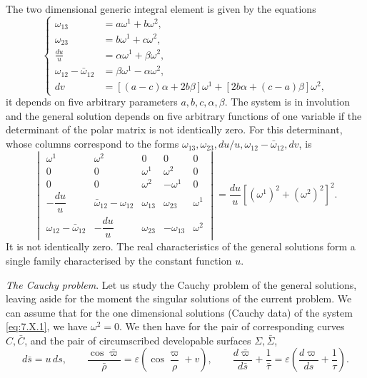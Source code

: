 \documentclass[leqno,11pt]{book}
\numberwithin{equation}{chapter}
\theoremstyle{shape1}
\theoremstyle{shape0}
\theoremstyle{shape2}
\theoremstyle{definition}
\begin{document}
The two dimensional generic integral element is given by the equations
\begin{equation}
  \label{eq:7.X.3}\tag{X, 3}
  \left\{
    \begin{aligned}
      \omega_{13}&=a\omega^{1}+b\omega^{2},\\
      \omega_{23}&=b\omega^{1}+c\omega^{2},\\
      \frac{du}{u}&=\alpha\omega^{1}+\beta\omega^{2},\\
      \omega_{12}-\bar\omega_{12}&=\beta\omega^{1}-\alpha\omega^{2},\\
      dv&=[(a-c)\alpha+2b\beta]\omega^{1}+[2b\alpha+(c-a)\beta]\omega^{2},
    \end{aligned}
  \right.
\end{equation}
it depends on five arbitrary parameters $a,b,c,\alpha,\beta$. The system is in involution and the general solution depends on five arbitrary functions of one variable if the determinant of the polar matrix is not identically zero. For this determinant, whose columns correspond to the forms $\omega_{13},\omega_{23},du/u,\omega_{12}-\bar\omega_{12},dv$, is
\[
\begin{vmatrix}
  \omega^{1}&\omega^{2}&0&0&0\\
  0&0&\omega^{1}&\omega^{2}&0\\
  0&0&\omega^{2}&-\omega^{1}&0\\
  -\dfrac{du}{u}&\bar\omega_{12}-\omega_{12}&\omega_{13}&\omega_{23}&\omega^{1}\\
  \omega_{12}-\bar\omega_{12}&-\dfrac{du}{u}&\omega_{23}&-\omega_{13}&\omega^{2}
\end{vmatrix}
=\frac{du}{u}[(\omega^{1})^{2}+(\omega^{2})^{2}]^{2}.
\]
It is not identically zero. The real characteristics of the general solutions form a single family characterised by the constant  function $u$.

\vspace{12pt}\fsec\emph{The Cauchy problem}. Let us study the Cauchy problem of the general solutions, leaving aside for the moment the singular solutions of the current problem. We can assume that for the one dimensional solutions (Cauchy data) of the system \eqref{eq:7.X.1}, we have $\omega^{2}=0$. We then have for the pair of corresponding curves $C,\bar C$, and the pair of circumscribed developable surfaces $\Sigma, \bar\Sigma$,
\[
d\bar s=u\,ds,\qquad\frac{\cos\bar\varpi}{\bar\rho}=\varepsilon\left(\cos\frac{\varpi}{\rho}+v\right),\qquad\frac{d\bar\varpi}{d\bar s}+\frac{1}{\bar \tau}=\varepsilon\left(\frac{d\varpi}{ds}+\frac{1}{\tau}\right).
\]
\end{document}
